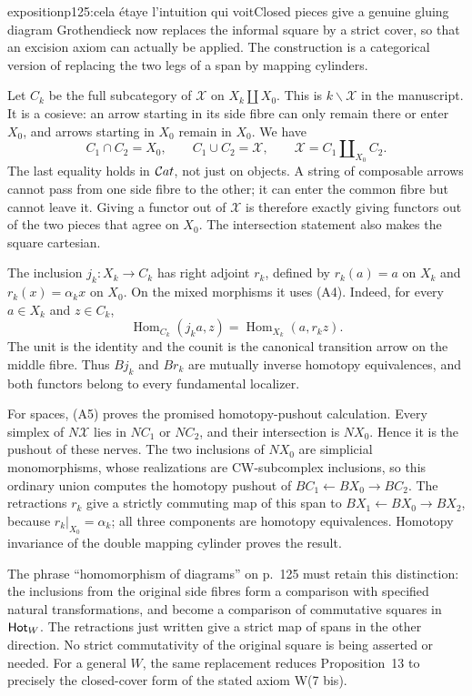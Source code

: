 \begin{dcomment}{exposition}{p125:cela étaye l'intuition qui voit}{Closed pieces give a genuine gluing diagram}
Grothendieck now replaces the informal square by a strict cover, so that an excision axiom can actually be applied.  The construction is a categorical version of replacing the two legs of a span by mapping cylinders.

Let $C_k$ be the full subcategory of $\mathcal X$ on $X_k\amalg X_0$.  This is $k\backslash\mathcal X$ in the manuscript.  It is a cosieve: an arrow starting in its side fibre can only remain there or enter $X_0$, and arrows starting in $X_0$ remain in $X_0$.  We have
\[
 C_1\cap C_2=X_0,\qquad C_1\cup C_2=\mathcal X,
 \qquad \mathcal X=C_1\amalg_{X_0}C_2.
 \tag{A5}
\]
The last equality holds in $\mathcal{C}at$, not just on objects.  A string of composable arrows cannot pass from one side fibre to the other; it can enter the common fibre but cannot leave it.  Giving a functor out of $\mathcal X$ is therefore exactly giving functors out of the two pieces that agree on $X_0$.  The intersection statement also makes the square cartesian.

The inclusion $j_k:X_k\to C_k$ has right adjoint $r_k$, defined by $r_k(a)=a$ on $X_k$ and $r_k(x)=\alpha_kx$ on $X_0$.  On the mixed morphisms it uses (A4).  Indeed, for every $a\in X_k$ and $z\in C_k$,
\[
 \operatorname{Hom}_{C_k}(j_ka,z)
       =\operatorname{Hom}_{X_k}(a,r_kz).
\]
The unit is the identity and the counit is the canonical transition arrow on the middle fibre.  Thus $Bj_k$ and $Br_k$ are mutually inverse homotopy equivalences, and both functors belong to every fundamental localizer.

For spaces, (A5) proves the promised homotopy-pushout calculation.  Every simplex of $N\mathcal X$ lies in $NC_1$ or $NC_2$, and their intersection is $NX_0$.  Hence it is the pushout of these nerves.  The two inclusions of $NX_0$ are simplicial monomorphisms, whose realizations are CW-subcomplex inclusions, so this ordinary union computes the homotopy pushout of $BC_1\leftarrow BX_0\to BC_2$.  The retractions $r_k$ give a strictly commuting map of this span to $BX_1\leftarrow BX_0\to BX_2$, because $r_k|_{X_0}=\alpha_k$; all three components are homotopy equivalences.  Homotopy invariance of the double mapping cylinder proves the result.

The phrase ``homomorphism of diagrams'' on p.~125 must retain this distinction: the inclusions from the original side fibres form a comparison with specified natural transformations, and become a comparison of commutative squares in $\mathsf{Hot}_W$.  The retractions just written give a strict map of spans in the other direction.  No strict commutativity of the original square is being asserted or needed.  For a general $W$, the same replacement reduces Proposition~13 to precisely the closed-cover form of the stated axiom W(7 bis).
\end{dcomment}


